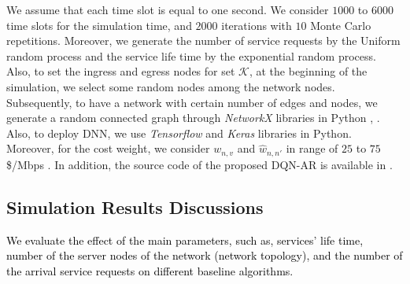 \documentclass[20pt,twocolumn]{IEEEtran}
\begin{document}
We assume that each time slot is equal to one second. We consider $1000$ to $6000$ time slots for  the simulation time, and $2000$ iterations \cite{10.1145/3326285.3329056} with $10$ Monte Carlo repetitions. Moreover, we generate the number of service requests by the Uniform random process \cite{ding2019deep} and the service life time by the exponential random process. Also, to set the ingress and egress nodes for set $\mathcal{K}$, at the beginning of the simulation, we select some random nodes among the network nodes. 
\\\indent
Subsequently, to have a network with certain number of  edges and nodes, we generate a random connected graph through \textit{NetworkX} libraries in Python \cite{fu2019dynamic}, \cite{ebrahimi2020joint}. Also, to deploy DNN, we use \textit{Tensorflow} and \textit{Keras} libraries in Python.  Moreover, for the cost weight, we consider  $w_{n,v}$ and $\hat{w}_{n,n'}$ in range of $25$ to $75$ \$/Mbps \cite{gholipoor2020e2e}. In addition, the source code of the proposed DQN-AR is available in \cite{ali2021}.
\subsection{{Simulation Results Discussions}}
\textcolor{black}{We evaluate the effect of the main parameters, such as, services' life time,  number of the server nodes of the network (network topology), and the number of the arrival service requests on different  baseline algorithms.}
\end{document}
